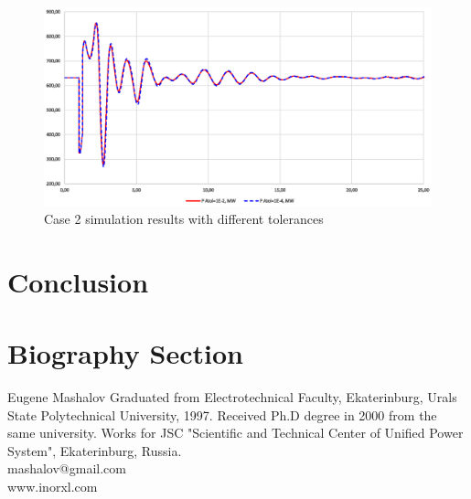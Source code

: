 \documentclass[lettersize,journal]{IEEEtran}
\begin{document}

\begin{figure}[htbp]
	\centering
	\includegraphics[width=.8\columnwidth]{case2atols.eps}
	\caption{Case 2 simulation results with different tolerances}
	\label{case2atols}
\end{figure}


\section {Conclusion}





\newpage
\section{Biography Section}
\vspace{-33pt}
\begin{IEEEbiography}{Eugene Mashalov}
Graduated from Electrotechnical Faculty, Ekaterinburg, Urals State Polytechnical University, 1997. 
Received Ph.D degree in 2000 from the same university. 
Works for JSC "Scientific and Technical Center of Unified Power System", Ekaterinburg, Russia.\\
mashalov@gmail.com \\
www.inorxl.com
\end{IEEEbiography}
\vfill
\end{document}
